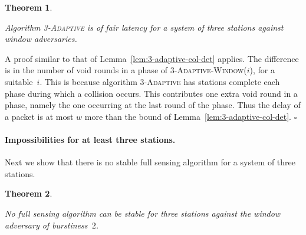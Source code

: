 \documentclass[11pt]{article}
\newcommand{\BBB}{\vspace*{-\bigskipamount}}
\newcommand{\Paragraph}[1]{\BBB\paragraph{#1}}
\newcommand{\qed}{\hfill $\square$ \smallbreak}
\newenvironment{proof}{\noindent{\bf Proof:}}{\qed}
\newtheorem{theorem}{Theorem}
\begin{document}

\begin{theorem}
\label{thm:3-adaptive-fair-latency}

Algorithm \textsc{3-Adaptive} is of fair latency for a system of three stations against window adversaries.
\end{theorem}

\begin{proof}
A proof similar to that of Lemma~\ref{lem:3-adaptive-col-det} applies.
The difference is in the number of void rounds in a phase of \textsc{3-Adaptive-Window($i$)}, for a suitable~$i$.
This is because algorithm \textsc{3-Adaptive} has stations complete each phase during which a collision occurs.
This contributes one extra void round in a phase, namely the one occurring at the last round of the phase.
Thus the delay of a packet is at most $w$ more than the bound of Lemma~\ref{lem:3-adaptive-col-det}.
\end{proof}





\Paragraph{Impossibilities for at least three stations.}





Next we show that there is no stable full sensing algorithm for a system of three stations.



\begin{theorem}
\label{thm:impossible-3-stations-full-sensing-stable}

No full sensing algorithm can be stable for three stations against the window adversary of burstiness~$2$.
\end{theorem}
\end{document}

